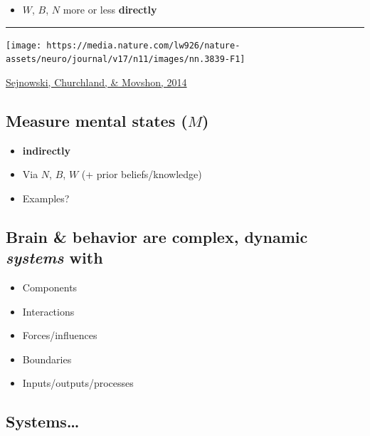 \documentclass[]{article}
\providecommand{\tightlist}{%
  \setlength{\itemsep}{0pt}\setlength{\parskip}{0pt}}
\begin{document}
\begin{itemize}
\tightlist
\item
  \(W\), \(B\), \(N\) more or less \textbf{directly}
\end{itemize}

\begin{center}\rule{0.5\linewidth}{\linethickness}\end{center}

\begin{center}\texttt{[image: https://media.nature.com/lw926/nature-assets/neuro/journal/v17/n11/images/nn.3839-F1]} \end{center}

 \href{http://doi.org/10.1038/nn.3839}{Sejnowski, Churchland, \&
Movshon, 2014}

\hypertarget{measure-mental-states-m}{%
\subsection{\texorpdfstring{Measure mental states
(\(M\))}{Measure mental states (M)}}\label{measure-mental-states-m}}

\begin{itemize}
\tightlist
\item
  \textbf{indirectly}
\item
  Via \(N\), \(B\), \(W\) (+ prior beliefs/knowledge)
\item
  Examples?
\end{itemize}

\hypertarget{brain-behavior-are-complex-dynamic-systems-with}{%
\subsection{\texorpdfstring{Brain \& behavior are complex, dynamic
\emph{systems}
with}{Brain \& behavior are complex, dynamic systems with}}\label{brain-behavior-are-complex-dynamic-systems-with}}

\begin{itemize}
\tightlist
\item
  Components
\item
  Interactions
\item
  Forces/influences
\item
  Boundaries
\item
  Inputs/outputs/processes
\end{itemize}

\hypertarget{systems}{%
\subsection{Systems\ldots{}}\label{systems}}
\end{document}
